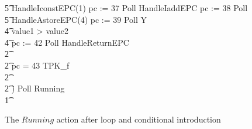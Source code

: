 \begin{figure}[t!]
\begin{circus}
    \t5 HandleIconstEPC(1) \circseq pc := 37 \circseq Poll \circseq HandleIaddEPC \circseq pc := 38 \circseq Poll \circseq \\
    \t5 HandleAstoreEPC(4) \circseq pc := 39 \circseq Poll \circseq Y \\
    \t4 {} \circelse value1 > value2 \circthen \Skip \\
    \t4 \circfi \circseq pc := 42 \circseq Poll \circseq HandleReturnEPC \\
    \t2 {} \cdots {} \\
    \t2 {} \circelse pc = 43 \circthen TPK\_f \\
    \t2 {} \cdots {} \\
    \t2 \circfi) \circseq Poll \circseq Running \\
    \t1 \circfi
  \end{circus}
  \caption{The $Running$ action after loop and conditional introduction}
  \label{loop-and-conditional-introduction-example-figure}
\end{figure}

